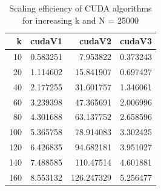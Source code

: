 \documentclass[11pt]{article}
\begin{document}
\begin{table}[htbp]
\caption{Scaling efficiency of CUDA algorithms for increasing k and N = 25000}
\centering
\begin{tabular}{rrrr}
\hline
k & cudaV1 & cudaV2 & cudaV3\\[0pt]
\hline
10 & 0.583251 & 7.953822 & 0.373243\\[0pt]
20 & 1.114602 & 15.841907 & 0.697427\\[0pt]
40 & 2.177255 & 31.601757 & 1.346061\\[0pt]
60 & 3.239398 & 47.365691 & 2.006996\\[0pt]
80 & 4.301688 & 63.137752 & 2.658596\\[0pt]
100 & 5.365758 & 78.914083 & 3.302425\\[0pt]
120 & 6.426835 & 94.682181 & 3.951027\\[0pt]
140 & 7.488585 & 110.47514 & 4.601881\\[0pt]
160 & 8.553132 & 126.247329 & 5.256477\\[0pt]
\hline
\end{tabular}
\end{table}

\printbibliography[heading=bibnumbered]
\end{document}
